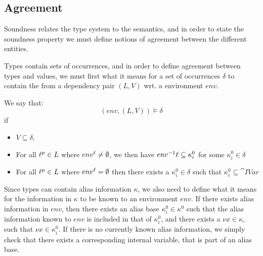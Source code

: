 \documentclass{llncs}
\begin{document}
\subsection{Agreement}
Soundness relates the type system to the semantics, and in order to
state the soundness property we must define notions of agreement
between the different entities.

Types contain sets of occurrences, and in order to define agreement
between types and values, we must first what it means for a set of
occurrences $\delta$ to contain the from a dependency pair $(L,V)$
wrt. a environment $env$.

\begin{definition}\label{def:DepAgree}
	We say that:
	$$(env,(L,V))\models\delta$$
	if
	\begin{itemize}
		\item $V\subseteq\delta$,
		\item For all $\ell^p\in L$ where
                  $env^{\ell}\neq\emptyset$, we then have $env^{-1} \ell \subseteq \kappa_i^0$ for some $\kappa_i^0\in\delta$
		\item For all $\ell^p\in L$ where $env^{\ell}=\emptyset$ then there exists a $\kappa_i^0\in\delta$ such that $\kappa_i^0\subseteq\cat{IVar}$
	\end{itemize}
      \end{definition}

      Since types can contain alias information $\kappa$, we also need
      to define what it means for the information in $\kappa$ to be
      known to an environment $env$.  If there exists alias
      information in $env$, then there exists an alias base
      $\kappa^0_i\in\kappa^0$ such that the alias information known to
      $env$ is included in that of $\kappa^0_i$, and there exists a
      $\nu x\in\kappa$, such that $\nu x\in \kappa^0_i$.  If there is
      no currently known alias information, we simply check that there
      exists a corresponding internal variable, that is part of an
      alias base.
\end{document}

